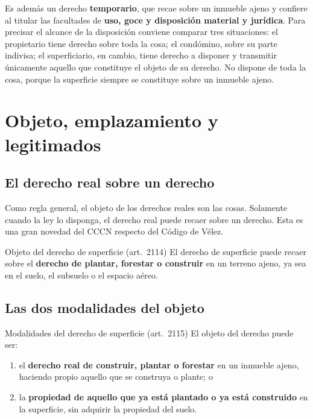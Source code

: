 \documentclass[12pt,oneside]{book}
\begin{document}
Es además un derecho \textbf{temporario}, que recae sobre un inmueble ajeno y confiere al titular las facultades de \textbf{uso, goce y disposición material y jurídica}. Para precisar el alcance de la disposición conviene comparar tres situaciones: el propietario tiene derecho sobre toda la cosa; el condómino, sobre su parte indivisa; el superficiario, en cambio, tiene derecho a disponer y transmitir únicamente aquello que constituye el objeto de su derecho. No dispone de toda la cosa, porque la superficie siempre se constituye sobre un inmueble ajeno.

\section{Objeto, emplazamiento y legitimados}

\subsection{El derecho real sobre un derecho}

Como regla general, el objeto de los derechos reales son las cosas. Solamente cuando la ley lo disponga, el derecho real puede recaer sobre un derecho. Esta es una gran novedad del CCCN respecto del Código de Vélez.

\begin{definition}{Objeto del derecho de superficie (art.~2114)}
El derecho de superficie puede recaer sobre el \textbf{derecho de plantar, forestar o construir} en un terreno ajeno, ya sea en el suelo, el subsuelo o el espacio aéreo.
\end{definition}

\subsection{Las dos modalidades del objeto}

\begin{definition}{Modalidades del derecho de superficie (art.~2115)}
El objeto del derecho puede ser:
\begin{enumerate}[label=(\alph*)]
    \item el \textbf{derecho real de construir, plantar o forestar} en un inmueble ajeno, haciendo propio aquello que se construya o plante; o
    \item la \textbf{propiedad de aquello que ya está plantado o ya está construido} en la superficie, sin adquirir la propiedad del suelo.
\end{enumerate}
\end{definition}
\end{document}
